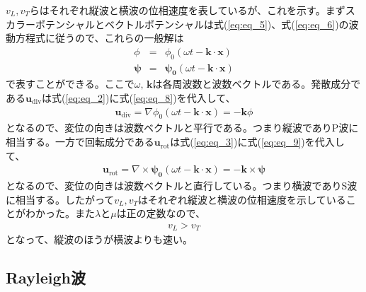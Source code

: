 $v_{L},v_{T}$らはそれぞれ縦波と横波の位相速度を表しているが、これを示す。まずスカラーポテンシャルとベクトルポテンシャルは式(\ref{eq:eq_5})、式(\ref{eq:eq_6})の波動方程式に従うので、これらの一般解は
\begin{eqnarray}
  \phi &=& \phi_{0}(\omega{t}-\bm{k}\cdot{\bm{x}}) \label{eq:eq_8}\\
  \bm{\psi} &=& \bm{\psi_{0}}(\omega{t}-\bm{k}\cdot{\bm{x}}) \label{eq:eq_9}
\end{eqnarray}
で表すことができる。ここで$\omega,\,\bm{k}$は各周波数と波数ベクトルである。発散成分である$\bm{u}_{\mathrm{div}}$は式(\ref{eq:eq_2})に式(\ref{eq:eq_8})を代入して、
\begin{eqnarray}
  \bm{u}_{\mathrm{div}} = \nabla{\phi_{0}(\omega{t}-\bm{k}\cdot{\bm{x}})} =-\bm{k}{\phi}
\end{eqnarray}
となるので、変位の向きは波数ベクトルと平行である。つまり縦波でありP波に相当する。一方で回転成分である$\bm{u}_{\mathrm{rot}}$は式(\ref{eq:eq_3})に式(\ref{eq:eq_9})を代入して、
\begin{eqnarray}
  \bm{u}_{\mathrm{rot}} = \nabla\times{\bm{\psi_{0}}(\omega{t}-\bm{k}\cdot{\bm{x}})} =-\bm{k}\times{\bm{\psi}}
\end{eqnarray}
となるので、変位の向きは波数ベクトルと直行している。つまり横波でありS波に相当する。したがって$v_{L},v_{T}$はそれぞれ縦波と横波の位相速度を示していることがわかった。また$\lambda$と$\mu$は正の定数なので、
\begin{eqnarray}
  v_{L} > v_{T}
\end{eqnarray}
となって、縦波のほうが横波よりも速い。

\subsection{Rayleigh波}





